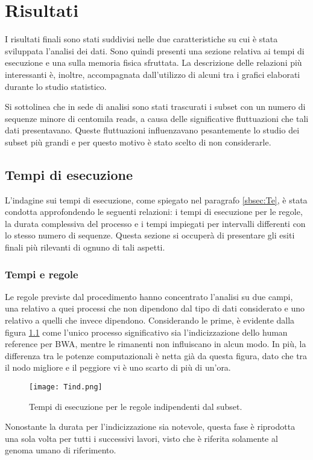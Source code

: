 \chapter{Risultati}
\label{cap:3}
I risultati finali sono stati suddivisi nelle due caratteristiche su cui è stata sviluppata l'analisi dei dati.
Sono quindi presenti una sezione relativa ai tempi di esecuzione e una sulla memoria fisica sfruttata. 
La descrizione delle relazioni più interessanti è, inoltre, accompagnata dall'utilizzo di alcuni tra i grafici elaborati durante lo studio statistico.

Si sottolinea che in sede di analisi sono stati trascurati i subset con un numero di sequenze minore di centomila reads, a causa delle significative fluttuazioni che tali dati presentavano.
Queste fluttuazioni influenzavano pesantemente lo studio dei subset più grandi e per questo motivo è stato scelto di non considerarle. 

\section{Tempi di esecuzione}
L'indagine sui tempi di esecuzione, come spiegato nel paragrafo \ref{sbsec:Te}, è stata condotta approfondendo le seguenti relazioni: i tempi di esecuzione per le regole, la durata complessiva del processo e i tempi impiegati per intervalli differenti con lo stesso numero di sequenze. 
Questa sezione si occuperà di presentare gli esiti finali più rilevanti di ognuno di tali aspetti.

\subsection{Tempi e regole}
Le regole previste dal procedimento hanno concentrato l'analisi su due campi, una relativo a quei processi che non dipendono dal tipo di dati considerato e uno relativo a quelli che invece dipendono. 
Considerando le prime, è evidente dalla figura \ref{fig:Tind} come l'unico processo significativo sia l'indicizzazione dello human reference per BWA, mentre le rimanenti non influiscano in alcun modo. 
In più, la differenza tra le potenze computazionali è netta già da questa figura, dato che tra il nodo migliore e il peggiore vi è uno scarto di più di un'ora.
\begin{figure}[H]
\centering
\texttt{[image: Tind.png]}
\caption{Tempi di esecuzione per le regole indipendenti dal subset.}
\label{fig:Tind}
\end{figure}
Nonostante la durata per l'indicizzazione sia notevole, questa fase è riprodotta una sola volta per tutti i successivi lavori, visto che è riferita solamente al genoma umano di riferimento.

